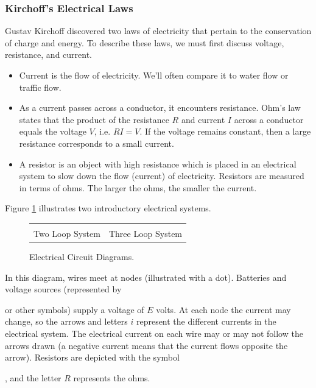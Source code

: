 \subsubsection*{Kirchoff's Electrical Laws}
Gustav Kirchoff discovered two laws of electricity that pertain to the conservation of charge and energy.  To describe these laws, we must first discuss voltage, resistance, and current.  
\begin{itemize}
 \item Current is the flow of electricity. We'll often compare it to water flow or traffic flow.
 \item As a current passes across a conductor, it encounters resistance. Ohm's law states that the product of the resistance $R$ and current $I$ across a conductor equals the voltage $V$, i.e. $RI=V$. If the voltage remains constant, then a large resistance corresponds to a small current. 
 \item A resistor is an object with high resistance which is placed in an electrical system to slow down the flow (current) of electricity.  Resistors are measured in terms of ohms. The larger the ohms, the smaller the current.   
\end{itemize}
Figure \ref{ecir} illustrates two introductory electrical systems.
\begin{figure}
\begin{center}
\begin{tabular}{cc}

&

\\
Two Loop System & Three Loop System
\end{tabular}\end{center}
\caption{Electrical Circuit Diagrams.\label{ecir}}
\end{figure}
In this diagram, wires meet at nodes (illustrated with a dot).  
Batteries and voltage sources (represented by 
or other symbols)
supply a voltage of $E$ volts.  At each node the current may change, so the arrows and letters $i$ represent the different currents in the electrical system. The electrical current on each wire may or may not follow the arrows drawn (a negative current means that the current flows opposite the arrow). Resistors are depicted with the symbol 	
, and the letter $R$ represents the ohms. 

